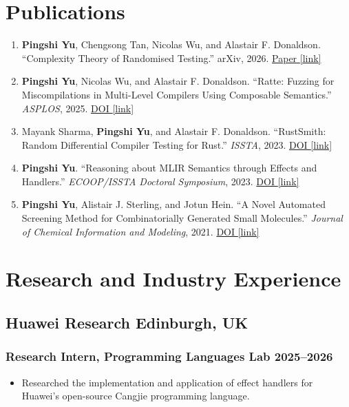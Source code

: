 \documentclass[11pt]{article}
\newcommand{\rside}[1]{\hfill {\normalfont\color{accent} #1}}
\newcommand{\linkicon}{{\color{gray}\footnotesize[link]}}
\begin{document}
\section{Publications}

\begin{enumerate}
  \item \textbf{Pingshi Yu}, Chengsong Tan, Nicolas Wu, and Alastair F. Donaldson. ``Complexity Theory of Randomised Testing.'' arXiv, 2026. \href{https://arxiv.org/abs/2607.11811}{Paper \linkicon}
  \item \textbf{Pingshi Yu}, Nicolas Wu, and Alastair F. Donaldson. ``Ratte: Fuzzing for Miscompilations in Multi-Level Compilers Using Composable Semantics.'' \textit{ASPLOS}, 2025. \href{https://doi.org/10.1145/3676641.3716270}{DOI \linkicon}
  \item Mayank Sharma, \textbf{Pingshi Yu}, and Alastair F. Donaldson. ``RustSmith: Random Differential Compiler Testing for Rust.'' \textit{ISSTA}, 2023. \href{https://doi.org/10.1145/3597926.3604919}{DOI \linkicon}
  \item \textbf{Pingshi Yu}. ``Reasoning about MLIR Semantics through Effects and Handlers.'' \textit{ECOOP/ISSTA Doctoral Symposium}, 2023. \href{https://doi.org/10.1145/3597926.3605239}{DOI \linkicon}
  \item \textbf{Pingshi Yu}, Alistair J. Sterling, and Jotun Hein. ``A Novel Automated Screening Method for Combinatorially Generated Small Molecules.'' \textit{Journal of Chemical Information and Modeling}, 2021. \href{https://doi.org/10.1021/acs.jcim.0c01462}{DOI \linkicon}
\end{enumerate}

\section{Research and Industry Experience}

\subsection{Huawei Research \rside{Edinburgh, UK}}
\subsubsection{Research Intern, Programming Languages Lab \rside{2025--2026}}
\begin{itemize}
  \item Researched the implementation and application of effect handlers for Huawei's open-source Cangjie programming language.
\end{itemize}
\end{document}
